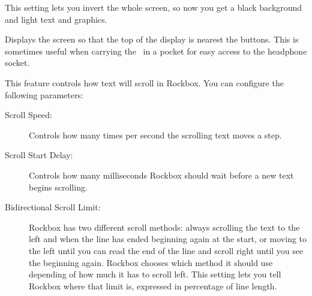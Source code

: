 \begin{description}
{\begin{description}
       \item[LCD Mode:]
         This setting lets you invert the whole screen, so now you get a
         black background and light text and graphics.
       \item[Upside Down:]
         Displays the screen so that the top of the display is nearest 
         the buttons. This is sometimes useful when carrying the \dap\ in a
         pocket for easy access to the headphone socket.
    \end{description}
  }
%
  \item[Scrolling]
    This feature controls how text will scroll in Rockbox. You can configure
    the following parameters:
    \begin{description}
    \item[Scroll Speed:]
      Controls how many times per second the scrolling text moves a step.
    \item[Scroll Start Delay:]
      Controls how many milliseconds Rockbox should wait before a new
      text begins scrolling.
    \item[Bidirectional Scroll Limit:]
      Rockbox has two different scroll methods: always scrolling the text
      to the left and when the line has ended beginning again at the start,
      or moving to the left until you can read the end of the line and scroll
      right until you see the beginning again. Rockbox chooses which method
      it should use depending of how much it has to scroll left. This setting
      lets you tell Rockbox where that limit is, expressed in percentage of
      line length.
\end{description}
\end{description}
